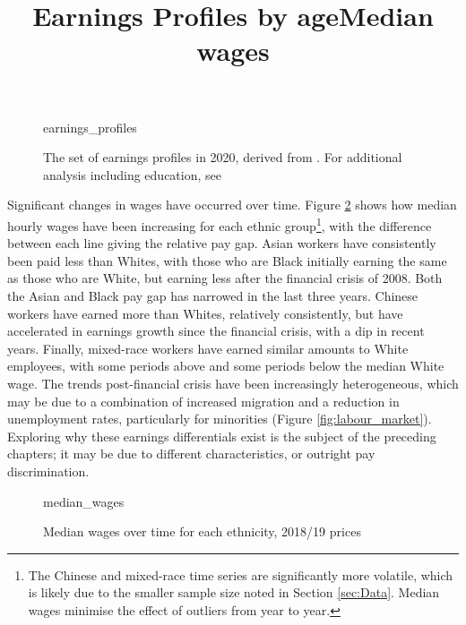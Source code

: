 \documentclass[class=article, crop=false]{standalone}
\begin{document}
\begin{figure}[h]
\centering
    \title{Earnings Profiles by age}
    {earnings_profiles}
    \caption{The set of earnings profiles in 2020, derived from \citet{ONSc}. For additional analysis including education, see \citet{Mincer}}
    \label{fig:earnings_profiles}
    \vspace{-10pt}
\end{figure}

Significant changes in wages have occurred over time. Figure \ref{fig:median_wages} shows how median hourly wages have been increasing for each ethnic group\footnote{The Chinese and mixed-race time series are significantly more volatile, which is likely due to the smaller sample size noted in Section \ref{sec:Data}. Median wages minimise the effect of outliers from year to year.}, with the difference between each line giving the relative pay gap. Asian workers have consistently been paid less than Whites, with those who are Black initially earning the same as those who are White, but earning less after the financial crisis of 2008. Both the Asian and Black pay gap has narrowed in the last three years. Chinese workers have earned more than Whites, relatively consistently, but have accelerated in earnings growth since the financial crisis, with a dip in recent years. Finally, mixed-race workers have earned similar amounts to White employees, with some periods above and some periods below the median White wage. The trends post-financial crisis have been increasingly heterogeneous, which may be due to a combination of increased migration \citep{ONSj} and a reduction in unemployment rates, particularly for minorities (Figure \ref{fig:labour_market}). Exploring why these earnings differentials exist is the subject of the preceding chapters; it may be due to different characteristics, or outright pay discrimination.

\begin{figure}[]
\centering
    \title{Median wages}
    {median_wages}
    \caption{Median wages over time for each ethnicity, 2018/19 prices}
    \label{fig:median_wages}
\end{figure}

\end{document}
